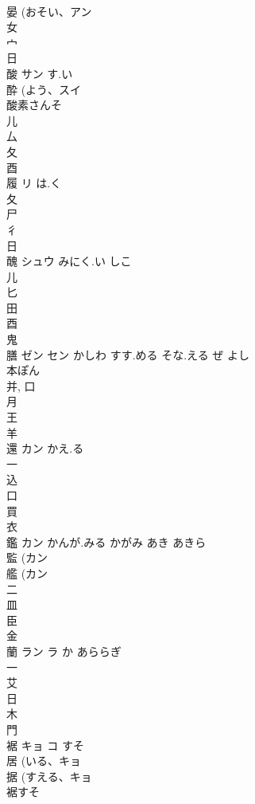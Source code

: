 \documentclass[8pt]{extreport}
\begin{document}
\begin{CJK}{UTF8}{min}
\\	晏 (おそい、アン 
\\	女 
\\	宀 
\\	日 
\\	酸	サン	す.い	
\\	酔 (よう、スイ 
\\	酸素さんそ
\\	儿 
\\	厶 
\\	夂 
\\	酉 
\\	履	リ	は.く	
\\	夂 
\\	尸 
\\	彳 
\\	日 
\\	醜	シュウ	みにく.い しこ	
\\	儿 
\\	匕 
\\	田 
\\	酉 
\\	鬼 
\\	膳	ゼン セン	かしわ すす.める そな.える ぜ よし	
\\	本ぽん 
\\	并, 口 
\\	月 
\\	王 
\\	羊 
\\	還	カン	かえ.る	
\\	一 
\\	込 
\\	口 
\\	買 
\\	衣 
\\	鑑	カン	かんが.みる かがみ あき あきら	
\\	監 (カン 
\\	艦 (カン 
\\	二 
\\	皿 
\\	臣 
\\	金 
\\	蘭	ラン ラ	か あららぎ	
\\	一 
\\	艾 
\\	日 
\\	木 
\\	門 
\\	裾	キョ コ	すそ	
\\	居 (いる、キョ 
\\	据 (すえる、キョ 
\\	裾すそ

\end{CJK}
\end{document}

